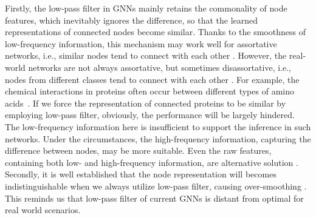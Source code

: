 \documentclass[letterpaper]{article} %
\begin{document}
Firstly, the low-pass filter in GNNs mainly retains the commonality of node features, which inevitably ignores the difference, so that the learned representations of connected nodes become similar. Thanks to the smoothness of low-frequency information, this mechanism may work well for assortative networks, i.e., similar nodes tend to connect with each other \cite{GraphHeat}.
However, the real-world networks are not always assortative, but sometimes disassortative, i.e., nodes from different classes tend to connect with each other \cite{mixing}.
For example, the chemical interactions in proteins often occur between different types of amino acids~\cite{H2GNN}.
If we force the representation of connected proteins to be similar by employing low-pass filter, obviously, the performance will be largely hindered. The low-frequency information here is insufficient to support the inference in such networks. Under the circumstances, the high-frequency information, capturing the difference between nodes, may be more suitable. Even the raw features, containing both low- and high-frequency information, are alternative solution \cite{AM-GCN}. Secondly, it is well established that the node representation will becomes indistinguishable when we always utilize low-pass filter, causing over-smoothing \cite{lossexp}. This reminds us that low-pass filter of current GNNs is distant from optimal for real world scenarios.
\end{document}
